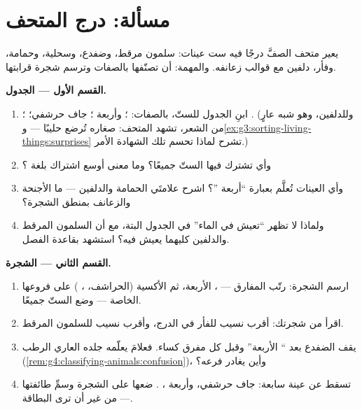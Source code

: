 \section{مسألة: درج المتحف}

\begin{problem}\label{pb:g6:classification-kinship:1}
يعير متحف الصفَّ درجًا فيه ست عينات: سلمون مرقط، وضفدع، وسحلية،
وحمامة، وفأر،  دلفين مع قوالب زعانفه. والمهمة: أن تصنّفها
بالصفات وترسم شجرة قرابتها.

\medskip\noindent\textbf{القسم الأول --- الجدول.}
\begin{enumerate}
  \item ابنِ الجدول للستّ، بالصفات: ؛ وأربعة ؛
         جاف حرشفي؛ ؛  . (وللدلفين، وهو شبه عارٍ
        من الشعر، تشهد  المتحف: صغاره تُرضع حليبًا ---
        و\cref{ex:g3:sorting-living-things:surprises} تشرح لماذا
        تحسم تلك الشهادة الأمر.)
  \item وأي  تشترك فيها الستّ جميعًا؟ وما معنى أوسع اشتراك
        بلغة ؟
  \item وأي العينات تُعلَّم بعبارة ``أربعة ''؟ اشرح علامتَي
        الحمامة والدلفين --- ما الأجنحة والزعانف بمنطق الشجرة؟
  \item ولماذا لا تظهر ``تعيش في الماء'' في الجدول البتة، مع أن
        السلمون المرقط والدلفين كليهما يعيش فيه؟ استشهد بقاعدة
        الفصل.
\end{enumerate}

\medskip\noindent\textbf{القسم الثاني --- الشجرة.}
\begin{enumerate}[resume]
  \item ارسم الشجرة: رتّب المفارق --- ، 
        الأربعة، ثم الأكسية (الحراشف، ، ) على فروعها
        الخاصة --- وضع الستّ جميعًا.
  \item اقرأ من شجرتك: أقرب نسيب للفأر في الدرج، وأقرب نسيب
        للسلمون المرقط.
  \item يقف الضفدع بعد `` الأربعة'' وقبل كل مفرق كساء.
        فعلامَ يعلّمه جلده العاري الرطب
        (\cref{rem:g4:classifying-animals:confusion})، وأين
        يغادر فرعه؟
  \item تسقط  عن عينة سابعة:  جاف حرشفي، وأربعة ،
        . ضعها على الشجرة وسمِّ طائفتها --- من غير أن
        ترى البطاقة.
\end{enumerate}


\end{problem}
